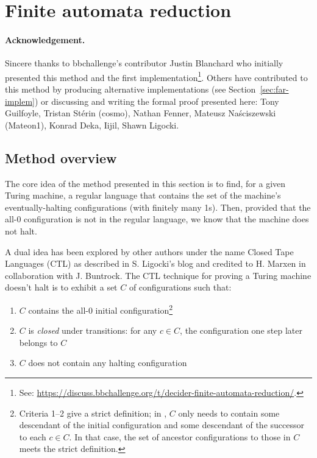 
\newpage
\section{Finite automata reduction}\label{sec:finite-automata-reduction}

\paragraph{Acknowledgement.} Sincere thanks to bbchallenge's contributor Justin Blanchard who initially presented this method and the first implementation\footnote{See: \url{https://discuss.bbchallenge.org/t/decider-finite-automata-reduction/}.}. Others have contributed to this method by producing alternative implementations (see Section~\ref{sec:far-implem}) or discussing and writing the formal proof presented here: Tony Guilfoyle, Tristan Stérin (cosmo), Nathan Fenner, Mateusz Naściszewski (Mateon1), Konrad Deka, Iijil, Shawn Ligocki. %


\subsection{Method overview}\label{far-overview}

The core idea of the method presented in this section is to find, for a given Turing machine, a regular language that contains the set of the machine's eventually-halting configurations (with finitely many 1s). Then, provided that the all-0 configuration is not in the regular language, we know that the machine does not halt.

A dual idea has been explored by other authors under the name Closed Tape Languages (CTL) as described in S. Ligocki's blog \cite{ShawnCTL} and credited to H. Marxen in collaboration with J. Buntrock.
The CTL technique for proving a Turing machine doesn't halt is to exhibit a set $C$ of configurations such that:

\begin{enumerate}
  \item $C$ contains the all-0 initial configuration\footnote{
          Criteria 1--2 give a strict definition; in \cite{ShawnCTL}, $C$ only needs to contain some descendant of the initial configuration and some descendant of the successor to each $c\in C$.
          In that case, the set of ancestor configurations to those in $C$ meets the strict definition.
        }
  \item $C$ is \textit{closed} under transitions: for any $c \in C$, the configuration one step later belongs to $C$\addtocounter{footnote}{-1}\addtocounter{Hfootnote}{-1}\footnotemark
  \item $C$ does not contain any halting configuration
\end{enumerate}


